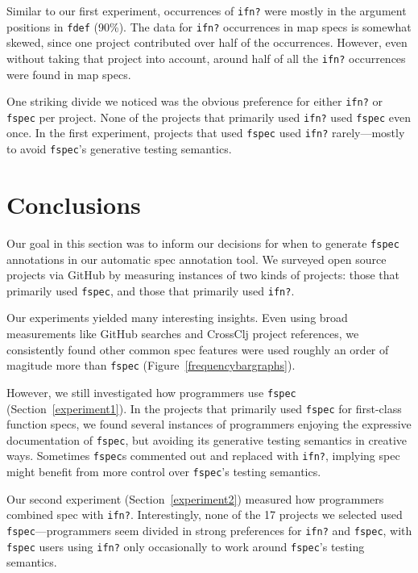 Similar to our first experiment, occurrences of \texttt{ifn?} were mostly in the argument
positions in \texttt{fdef} (90\%).
The data for \texttt{ifn?} occurrences in map specs is somewhat skewed, since one project
contributed over half of the occurrences. However, even without taking that project into account,
around half of all the \texttt{ifn?} occurrences were found in map specs.

One striking divide we noticed was the obvious preference for either \texttt{ifn?} or \texttt{fspec}
per project. None of the projects that primarily used \texttt{ifn?} used \texttt{fspec} even once.
In the first experiment, projects that used \texttt{fspec} used \texttt{ifn?} rarely---mostly to
avoid \texttt{fspec}'s generative testing semantics.

\section{Conclusions}

Our goal in this section was to inform our decisions for when to generate \texttt{fspec}
annotations in our automatic spec annotation tool.
We surveyed open source projects via GitHub by measuring instances of two kinds of projects:
those that primarily used \texttt{fspec}, and those that primarily used \texttt{ifn?}.

Our experiments yielded many interesting insights. Even using broad measurements like
GitHub searches and CrossClj project references,
we consistently found other common spec features were used roughly an order of
magitude more than \texttt{fspec} (Figure~\ref{frequencybargraphs}).

However, we still investigated how programmers use \texttt{fspec} (Section~\ref{experiment1}).
In the projects that primarily used \texttt{fspec} for first-class function specs,
we found several instances of programmers enjoying the expressive documentation
of \texttt{fspec}, but avoiding its generative testing semantics in creative ways.
Sometimes \texttt{fspec}s commented out and replaced with \texttt{ifn?}, implying
spec might benefit from more control over \texttt{fspec}'s testing semantics.

Our second experiment (Section~\ref{experiment2}) measured how programmers combined
spec with \texttt{ifn?}.
Interestingly, none of the 17 projects we selected used \texttt{fspec}---programmers
seem divided in strong preferences for \texttt{ifn?} and \texttt{fspec}, with
\texttt{fspec} users using \texttt{ifn?} only occasionally to work around
\texttt{fspec}'s testing semantics.

